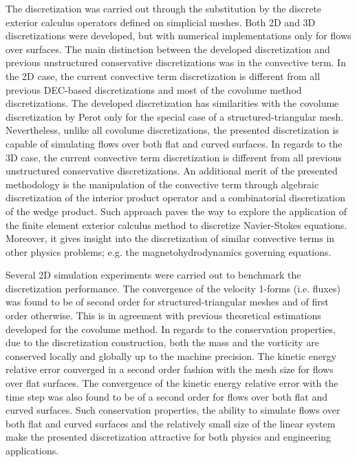\documentclass[final,12pt,times]{elsarticle}
\begin{document}
The discretization was carried out through the substitution by the discrete exterior calculus operators defined on simplicial meshes. Both 2D and 3D discretizations were developed, but with numerical implementations only for flows over surfaces. The main distinction between the developed discretization and previous unstructured conservative discretizations was in the convective term. In the 2D case, the current convective term discretization is different from all previous DEC-based discretizations and most of the covolume method discretizations. The developed discretization has similarities with the covolume discretization by Perot \cite{perot2000conservation} only for the special case of a structured-triangular mesh. Nevertheless, unlike all covolume discretizations, the presented discretization is capable of simulating flows over both flat and curved surfaces. In regards to the 3D case, the current convective term discretization is different from all previous unstructured conservative discretizations. An additional merit of the presented methodology is the manipulation of the convective term through algebraic discretization of the interior product operator and a combinatorial discretization of the wedge product. Such approach paves the way to explore the application of the finite element exterior calculus method to discretize Navier-Stokes equations. Moreover, it gives insight into the discretization of similar convective terms in other physics problems; e.g. the magnetohydrodynamics governing equations. 

Several 2D simulation experiments were carried out to benchmark the discretization performance. The convergence of the velocity 1-forms (i.e. fluxes) was found to be of second order for structured-triangular meshes and of first order otherwise. This is in agreement with previous theoretical estimations developed for the covolume method. In regards to the conservation properties, due to the discretization construction, both the mass and the vorticity are conserved locally and globally up to the machine precision. The kinetic energy relative error converged in a second order fashion with the mesh size for flows over flat surfaces. The convergence of the kinetic energy relative error with the time step was also found to be of a second order for flows over both flat and curved surfaces. Such conservation properties, the ability to simulate flows over both flat and curved surfaces and the relatively small size of the linear system make the presented discretization attractive for both physics and engineering applications.      
\end{document}
